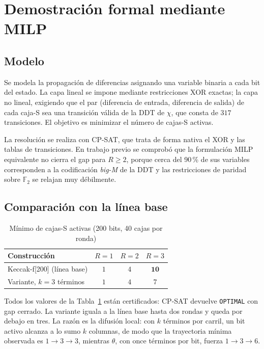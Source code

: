 \documentclass[conference]{IEEEtran}
\newcommand{\Fdos}{\mathbb{F}_2}
\begin{document}
\section{Demostración formal mediante MILP}

\subsection{Modelo}

Se modela la propagación de diferencias asignando una variable binaria a cada bit
del estado. La capa lineal se impone mediante restricciones XOR exactas; la capa
no lineal, exigiendo que el par (diferencia de entrada, diferencia de salida) de
cada caja-S sea una transición válida de la DDT de $\chi$, que consta de $317$
transiciones. El objetivo es minimizar el número de cajas-S activas.

La resolución se realiza con CP-SAT, que trata de forma nativa el XOR y las tablas
de transiciones. En trabajo previo se comprobó que la formulación MILP equivalente
no cierra el gap para $R \ge 2$, porque cerca del 90\,\% de sus variables
corresponden a la codificación \emph{big-M} de la DDT y las restricciones de
paridad sobre $\Fdos$ se relajan muy débilmente.

\subsection{Comparación con la línea base}

\begin{table}[t]
\caption{Mínimo de cajas-S activas (200 bits, 40 cajas por ronda)}
\label{tab:milp}
\centering
\begin{tabular}{@{}lccc@{}}
\toprule
Construcción & $R{=}1$ & $R{=}2$ & $R{=}3$ \\
\midrule
Keccak-f[200] (línea base) & $1$ & $4$ & $\mathbf{10}$ \\
Variante, $k=3$ términos   & $1$ & $4$ & $7$ \\
\bottomrule
\end{tabular}
\end{table}

Todos los valores de la Tabla~\ref{tab:milp} están certificados: CP-SAT devuelve
\texttt{OPTIMAL} con gap cerrado. La variante iguala a la línea base hasta dos
rondas y queda por debajo en tres. La razón es la difusión local: con $k$ términos
por carril, un bit activo alcanza a lo sumo $k$ columnas, de modo que la
trayectoria mínima observada es $1 \to 3 \to 3$, mientras $\theta$, con once
términos por bit, fuerza $1 \to 3 \to 6$.
\end{document}
